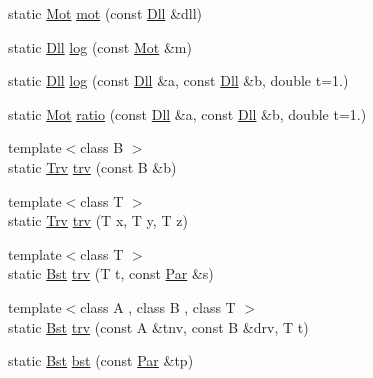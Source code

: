 \begin{DoxyCompactItemize}
\item 
static \hyperlink{namespacevsr_ad4b77d620ed90deefbeab9d4a122667e}{Mot} \hyperlink{structvsr_1_1_gen_ae70e0f3ae87c6b17b50a2c17bf3473bd}{mot} (const \hyperlink{namespacevsr_a6c6892b7aec25cfb16492501e2e35b11}{Dll} \&dll)
\item 
static \hyperlink{namespacevsr_a6c6892b7aec25cfb16492501e2e35b11}{Dll} \hyperlink{structvsr_1_1_gen_aa8a5b5c64a3c8548e3dfda8f07f7f522}{log} (const \hyperlink{namespacevsr_ad4b77d620ed90deefbeab9d4a122667e}{Mot} \&m)
\item 
static \hyperlink{namespacevsr_a6c6892b7aec25cfb16492501e2e35b11}{Dll} \hyperlink{structvsr_1_1_gen_a42abd8a02b66a14daeb5b46be4c5934e}{log} (const \hyperlink{namespacevsr_a6c6892b7aec25cfb16492501e2e35b11}{Dll} \&a, const \hyperlink{namespacevsr_a6c6892b7aec25cfb16492501e2e35b11}{Dll} \&b, double t=1.)
\item 
static \hyperlink{namespacevsr_ad4b77d620ed90deefbeab9d4a122667e}{Mot} \hyperlink{structvsr_1_1_gen_aef919bb95d9eb0f1ba801f5e0c7c0694}{ratio} (const \hyperlink{namespacevsr_a6c6892b7aec25cfb16492501e2e35b11}{Dll} \&a, const \hyperlink{namespacevsr_a6c6892b7aec25cfb16492501e2e35b11}{Dll} \&b, double t=1.)
\item 
{\footnotesize template$<$class B $>$ }\\static \hyperlink{namespacevsr_a0987f82365250bd245fa294583decadc}{Trv} \hyperlink{structvsr_1_1_gen_a80849f2409523a40ef840620908d5e61}{trv} (const B \&b)
\item 
{\footnotesize template$<$class T $>$ }\\static \hyperlink{namespacevsr_a0987f82365250bd245fa294583decadc}{Trv} \hyperlink{structvsr_1_1_gen_a052defec79126be45755260114576bfd}{trv} (T x, T y, T z)
\item 
{\footnotesize template$<$class T $>$ }\\static \hyperlink{namespacevsr_a9f737171e19572794ba7b6c12e8e679f}{Bst} \hyperlink{structvsr_1_1_gen_ab3fdc56754dd18d28be949c49d8334eb}{trv} (T t, const \hyperlink{namespacevsr_ae046793ece205351429a6346a66fd6eb}{Par} \&s)
\item 
{\footnotesize template$<$class A , class B , class T $>$ }\\static \hyperlink{namespacevsr_a9f737171e19572794ba7b6c12e8e679f}{Bst} \hyperlink{structvsr_1_1_gen_ad1d00332f01e540fb8aec5747b9ce745}{trv} (const A \&tnv, const B \&drv, T t)
\item 
static \hyperlink{namespacevsr_a9f737171e19572794ba7b6c12e8e679f}{Bst} \hyperlink{structvsr_1_1_gen_aa37201e34519afd30187e9f948b922ec}{bst} (const \hyperlink{namespacevsr_ae046793ece205351429a6346a66fd6eb}{Par} \&tp)

\end{DoxyCompactItemize}
